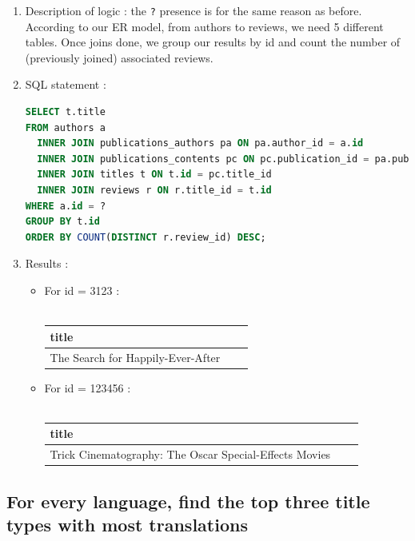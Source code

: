 \documentclass[doubleside, titlepage]{article}
\begin{document}
	\begin{enumerate}
	\item Description of logic : the \texttt{?} presence is for the same reason as before. According to our ER model, from authors to reviews, we need 5 different tables. Once joins done, we group our results by id and count the number of (previously joined) associated reviews.
	\item SQL statement :
		\begin{lstlisting}[language=SQL,showspaces=false,basicstyle=\ttfamily,numberstyle=\tiny,commentstyle=\color{gray}]
SELECT t.title
FROM authors a
  INNER JOIN publications_authors pa ON pa.author_id = a.id
  INNER JOIN publications_contents pc ON pc.publication_id = pa.publication_id
  INNER JOIN titles t ON t.id = pc.title_id
  INNER JOIN reviews r ON r.title_id = t.id
WHERE a.id = ?
GROUP BY t.id
ORDER BY COUNT(DISTINCT r.review_id) DESC;
		\end{lstlisting}

	\item Results :
	\begin{itemize}
	\item For id = 3123 : ~\\~\\
	\begin{tabular}{|l|c|r|}
	  \hline
		title \\
	  \hline
		The Search for Happily-Ever-After\\
	  \hline
	\end{tabular}
	\item For id = 123456 :~\\~\\
	\begin{tabular}{|l|c|r|}
	  \hline
		title \\
	  \hline
		Trick Cinematography: The Oscar Special-Effects Movies\\
	  \hline
	\end{tabular}
	\end{itemize}
\end{enumerate}

\subsection{For every language, find the top three title types with most translations}
\end{document}
